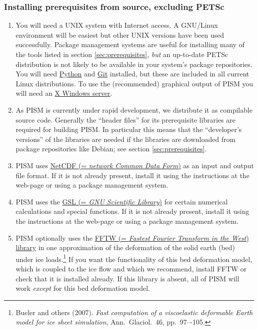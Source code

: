 \documentclass[titlepage,letterpaper,final]{scrartcl}
\begin{document}
\subsubsection{Installing prerequisites from source, excluding PETSc}
\label{subsec:prereq-source}
\renewcommand{\labelenumi}{\textbf{\arabic{enumi}.}~}
\begin{enumerate}
\item You will need a UNIX system with Internet access. A GNU/Linux environment
  will be easiest but other UNIX versions have been used successfully. Package
  management systems are useful for installing many of the tools listed in
  section \ref{sec:prerequisites}, \emph{but} an up-to-date PETSc distribution
  is not likely to be available in your system's package repositories. You will need
  \href{http://www.python.org/}{Python} and \href{http://git-scm.com/}{Git}
  installed, but these are included in all current Linux distributions. To use
  the (recommended) graphical output of PISM you will need an
  \href{http://www.x.org/}{X Windows server}.

\item As PISM is currently under rapid development, we distribute it as
  compilable source code.  Generally the ``header files'' for its prerequisite libraries
  are required for building PISM.  In particular this means that the
  ``developer's versions'' of the libraries are needed if the libraries are
  downloaded from package repositories like Debian; see section \ref{sec:prerequisites}.

\item PISM uses \href{http://www.unidata.ucar.edu/software/netcdf/}{NetCDF (=
  \emph{network Common Data Form})} as an input and output
  file format. If it is not already present, install it using the instructions
  at the web-page or using a package management system.

\item PISM uses the \href{http://www.gnu.org/software/gsl/}{GSL (= \emph{GNU
      Scientific Library})} for
  certain numerical calculations and special functions. If it is not already
  present, install it using the instructions at the web-page or using a package
  management system.

\item PISM optionally uses the \href{http://www.fftw.org/}{FFTW
 (= \emph{Fastest Fourier Transform in the West}) library} in one approximation of the
  deformation of the solid earth (bed) under ice loads.\footnote{Bueler and
    others (2007). \emph{Fast computation of a viscoelastic deformable Earth
      model for ice sheet simulation}, Ann.~Glaciol.~46, pp.~97–-105.} If you
  want the functionality of this bed deformation model, which is coupled to the
  ice flow and which we recommend, install FFTW or check that it is installed
  already. If this library is absent, all of PISM will work \emph{except} for
  this bed deformation model.


\end{enumerate}
\end{document}
